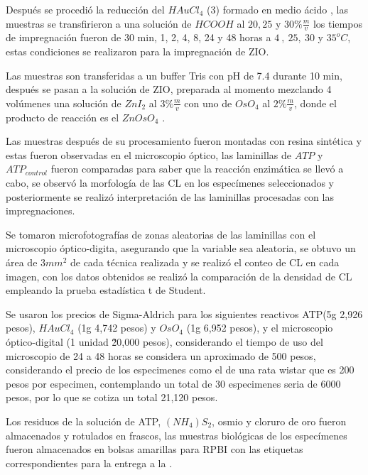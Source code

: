 Después se procedió la reducción del $HAuCl_{4}$ (3) formado en medio ácido \cite{article:reduccionOro}, las muestras se transfirieron a una solución de $HCOOH$ al $20,25$ y $30\%\frac{m}{v}$ los tiempos de impregnación fueron de 30 min, 1, 2, 4, 8, 24 y 48 horas a $4~,~25,~30$ y $35^oC$, estas condiciones se realizaron para la impregnación de ZIO.




Las muestras son transferidas a un buffer Tris con pH de 7.4 durante 10 min, después se pasan a la solución de ZIO, preparada al momento mezclando 4 volúmenes una solución de $ZnI_{2}$ al $3\%\frac{m}{v}$ con uno de $OsO_{4}$ al $2\%\frac{m}{v}$, donde el producto de reacción es el $ZnOsO_{4}$ \cite{article:productoZIO}.


Las muestras después de su procesamiento fueron montadas con resina sintética y estas fueron observadas en el microscopio óptico, las laminillas de $ATP$ y $ATP_{control}$ fueron comparadas para saber que la reacción enzimática se llevó a cabo, se observó la morfología de las CL en los especímenes seleccionados y posteriormente se realizó interpretación de las laminillas procesadas con las impregnaciones.


Se tomaron microfotografías de zonas aleatorias de las laminillas con el microscopio óptico-digita, asegurando que la variable sea aleatoria, se obtuvo un área de $3mm^{2}$ de cada técnica realizada y se realizó el conteo de CL en cada imagen, con los datos obtenidos se realizó la comparación de la densidad de CL empleando la prueba estadística t de Student.


Se usaron los precios de Sigma-Aldrich para los siguientes reactivos ATP(5g 2,926 pesos), $HAuCl_{4}$ (1g 4,742 pesos) y $OsO_{4}$ (1g 6,952 pesos), y el microscopio óptico-digital (1 unidad \~20,000 pesos), considerando el tiempo de uso del microscopio de 24 a 48 horas se considera un aproximado de 500 pesos, considerando el precio de los especimenes como el de una rata wistar que es 200 pesos por especimen, contemplando un total de 30 especimenes seria de 6000 pesos, por lo que se cotiza un total 21,120 pesos.


Los residuos de la solución de ATP, $(NH_{4})S_{2}$, osmio y cloruro de oro fueron almacenados y rotulados en frascos, las muestras biológicas de los especímenes fueron almacenados en bolsas amarillas para RPBI con las etiquetas correspondientes para la entrega a la .



